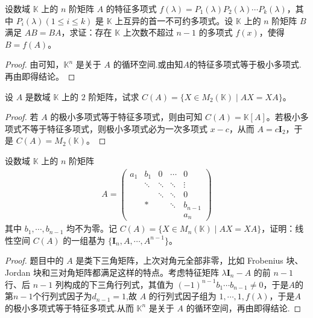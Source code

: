 \documentclass[../../main.tex]{subfiles}
\begin{document}
\begin{example}
设数域 $\mathbb{K}$ 上的 $n$ 阶矩阵 $A$ 的特征多项式 $f(\lambda)=P_1(\lambda)P_2(\lambda)\cdots P_k(\lambda)$，其中 $P_i(\lambda) (1\leqslant  i\leqslant  k)$ 是 $\mathbb{K}$ 上互异的首一不可约多项式。设 $\mathbb{K}$ 上的 $n$ 阶矩阵 $B$ 满足 $AB = BA$，求证：存在 $\mathbb{K}$ 上次数不超过 $n - 1$ 的多项式 $f(x)$，使得 $B = f(A)$。
\end{example}
\begin{proof}
由可知，$\mathbb{K}^n$ 是关于 $A$ 的循环空间.或由知$A$的特征多项式等于极小多项式.再由即得结论。

\end{proof}

\begin{example}
设 $A$ 是数域 $\mathbb{K}$ 上的 $2$ 阶矩阵，试求 $C(A)=\{X\in M_2(\mathbb{K})\mid AX = XA\}$。
\end{example}
\begin{proof}
若 $A$ 的极小多项式等于特征多项式，则由可知 $C(A)=\mathbb{K}[A]$。若极小多项式不等于特征多项式，则极小多项式必为一次多项式 $x - c$，从而 $A = c\boldsymbol{I}_2$，于是 $C(A)=M_2(\mathbb{K})$。

\end{proof}

\begin{example}
设数域 $\mathbb{K}$ 上的 $n$ 阶矩阵
\begin{align*}
A=\begin{pmatrix}
a_1 & b_1 & 0 & \cdots & 0 \\
& \ddots & \ddots & \ddots & \vdots \\
& & \ddots & \ddots & 0 \\
& * & & \ddots & b_{n - 1} \\
& & & & a_n
\end{pmatrix}
\end{align*}
其中 $b_1,\cdots,b_{n - 1}$ 均不为零。记 $C(A)=\{X\in M_n(\mathbb{K})\mid AX = XA\}$，证明：线性空间 $C(A)$ 的一组基为 $\{\boldsymbol{I}_n,A,\cdots,A^{n - 1}\}$。
\end{example}
\begin{proof}
题目中的 $A$ 是类下三角矩阵，上次对角元全部非零，比如 Frobenius 块、Jordan 块和三对角矩阵都满足这样的特点。考虑特征矩阵 $\lambda\boldsymbol{I}_n - A$ 的前 $n - 1$ 行、后 $n - 1$ 列构成的下三角行列式，其值为 $(-1)^{n - 1}b_1\cdots b_{n - 1}\neq 0$，于是$A$的第$n-1$个行列式因子为$d_{n-1}=1$,故 $A$ 的行列式因子组为 $1,\cdots,1,f(\lambda)$，于是$A$的极小多项式等于特征多项式.从而 $\mathbb{K}^n$ 是关于 $A$ 的循环空间，再由即得结论.

\end{proof}
\end{document}
